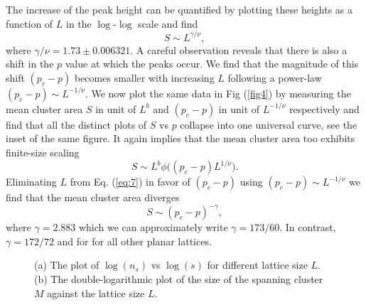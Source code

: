 \documentclass[twocolumn,showpacs,preprintnumbers,amsmath,amssymb]{article}
\begin{document}
The increase of the peak height can be quantified by plotting 
these heights as a function of $L$ in the $\log$-$\log$ scale and find
\begin{equation}
\label{eq:7}
S\sim L^{\gamma/\nu},
\end{equation}
where $\gamma/\nu=1.73\pm 0.006321$. A careful observation reveals that there is also a shift in the $p$ value at which the peaks occur. 
We find that the magnitude of this shift $(p_c-p)$ becomes smaller with
increasing $L$ following a power-law $(p_c-p)\sim L^{-1/\nu}$. 
 We now plot the same
data in Fig (\ref{fig4}) by measuring the mean cluster area
$S$ in unit of $L^b$ and $(p_c-p)$ in unit of $L^{-1/\nu}$ respectively and find that all the distinct plots of
 $S$ vs $p$ collapse into one universal curve, see the inset of the same figure. It again implies that the mean cluster area too exhibits finite-size scaling
\begin{equation}
\label{eq:8}
S \sim L^{b}\phi \Big ((p_c-p)L^{1/\nu}\Big ).
\end{equation}
Eliminating $L$ from Eq. (\ref{eq:7}) in favor of $(p_c-p)$ using $(p_c-p)\sim L^{-1/\nu}$ we find that the mean cluster
area diverges 
\begin{equation}
\label{eq:9}
S\sim (p_c-p)^{-\gamma},
\end{equation}
where $\gamma=2.883$ which we can approximately write $\gamma=173/60$. In contrast, $\gamma=172/72$  and for for all other planar lattices.


\begin{figure}
\centering

\caption{(a) The plot of $\log(n_s)$ vs $\log(s)$  for different lattice size $L$.
(b) The double-logarithmic plot of the size of the spanning cluster $M$ against the lattice size $L$. 
} 
\label{fig:ab}
\end{figure}
\end{document}
